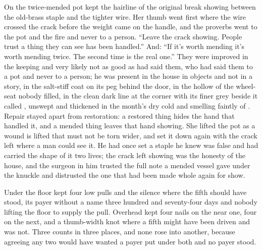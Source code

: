On  the twice-mended pot kept the hairline of the original break showing between the old-brass staple and the tighter wire. Her thumb went first where the wire crossed the crack before the weight came on the handle, and the proverbs went to the pot and the fire and never to a person. “Leave the crack showing. People trust a thing they can see has been handled.” And: “If it's worth mending it's worth mending twice. The second time is the real one.” They were improved in the keeping and very likely not as good as  had said them, who had said them to a pot and never to a person; he was present in the house in objects and not in a story, in the salt-stiff coat on its peg behind the door, in the hollow of the wheel-seat nobody filled, in the clean dark line at the corner with its finer grey beside it called , unswept and thickened in the month's dry cold and smelling faintly of . Repair stayed apart from restoration: a restored thing hides the hand that handled it, and a mended thing leaves that hand showing. She lifted the pot as a wound is lifted that must not be torn wider, and set it down again with the crack left where a man could see it. He had once set a staple he knew was false and had carried the shape of it two lives; the crack left showing was the honesty of the house, and the surgeon in him trusted the full note a mended vessel gave under the knuckle and distrusted the one that had been made whole again for show.

Under the floor  kept four low pulls and the silence where the fifth should have stood, its payer without a name three hundred and seventy-four days and nobody lifting the floor to supply the pull. Overhead  kept four nails on the near one, four on the next, and a thumb-width knot where a fifth might have been driven and was not. Three counts in three places, and none rose into another, because agreeing any two would have wanted a payer put under both and no payer stood.

